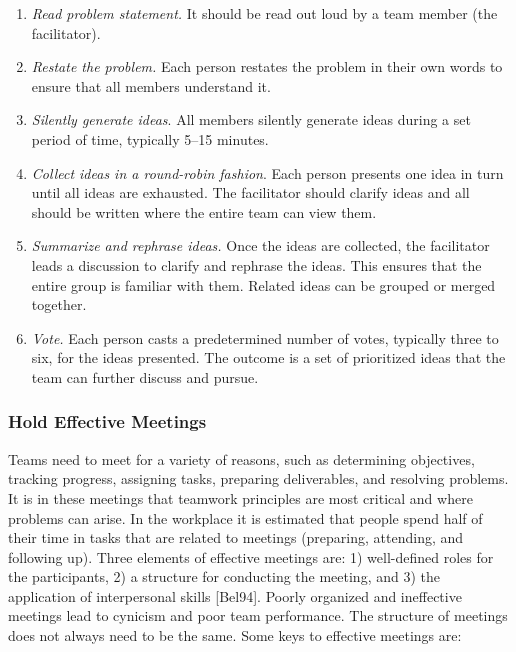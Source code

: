\begin{enumerate}
\def\labelenumi{\arabic{enumi}.}
\item
  \emph{Read problem statement.} It should be read out loud by a team
  member (the facilitator).
\item
  \emph{Restate the problem.} Each person restates the problem in their
  own words to ensure that all members understand it.
\item
  \emph{Silently generate ideas}. All members silently generate ideas
  during a set period of time, typically 5­--15 minutes.
\item
  \emph{Collect ideas in a round-robin fashion}. Each person presents
  one idea in turn until all ideas are exhausted. The facilitator should
  clarify ideas and all should be written where the entire team can view
  them.
\item
  \emph{Summarize and rephrase ideas.} Once the ideas are collected, the
  facilitator leads a discus­sion to clarify and rephrase the ideas. This
  ensures that the entire group is familiar with them. Related ideas can
  be grouped or merged together.
\item
  \emph{Vote.} Each person casts a predetermined number of votes,
  typically three to six, for the ideas presented. The outcome is a set
  of prioritized ideas that the team can further discuss and pursue.
\end{enumerate}

\subsubsection{Hold Effective Meetings}\label{hold-effective-meetings}

Teams need to meet for a variety of reasons, such as determining
objectives, tracking progress, assigning tasks, preparing deliverables,
and resolving problems. It is in these meetings that teamwork principles
are most critical and where problems can arise. In the workplace it is
estimated that people spend half of their time in tasks that are related
to meetings (preparing, attending, and following up). Three elements of
effective meetings are: 1) well-defined roles for the participants, 2) a
structure for conducting the meeting, and 3) the application of
interpersonal skills {[}Bel94{]}. Poorly organized and ineffective
meetings lead to cynicism and poor team performance. The structure of
meetings does not always need to be the same. Some keys to effective
meetings are:

